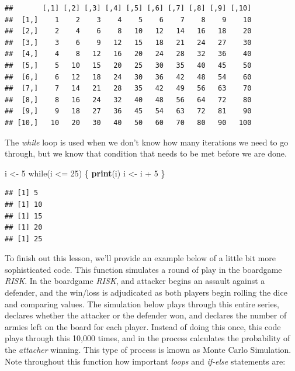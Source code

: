 \documentclass[]{book}
\newenvironment{Shaded}{\begin{snugshade}}{\end{snugshade}}
\newcommand{\KeywordTok}[1]{\textcolor[rgb]{0.13,0.29,0.53}{\textbf{{#1}}}}
\newcommand{\DecValTok}[1]{\textcolor[rgb]{0.00,0.00,0.81}{{#1}}}
\newcommand{\StringTok}[1]{\textcolor[rgb]{0.31,0.60,0.02}{{#1}}}
\newcommand{\NormalTok}[1]{{#1}}
\begin{document}
\begin{verbatim}
##       [,1] [,2] [,3] [,4] [,5] [,6] [,7] [,8] [,9] [,10]
##  [1,]    1    2    3    4    5    6    7    8    9    10
##  [2,]    2    4    6    8   10   12   14   16   18    20
##  [3,]    3    6    9   12   15   18   21   24   27    30
##  [4,]    4    8   12   16   20   24   28   32   36    40
##  [5,]    5   10   15   20   25   30   35   40   45    50
##  [6,]    6   12   18   24   30   36   42   48   54    60
##  [7,]    7   14   21   28   35   42   49   56   63    70
##  [8,]    8   16   24   32   40   48   56   64   72    80
##  [9,]    9   18   27   36   45   54   63   72   81    90
## [10,]   10   20   30   40   50   60   70   80   90   100
\end{verbatim}

The \emph{while} loop is used when we don't know how many iterations we
need to go through, but we know that condition that needs to be met
before we are done.

\begin{Shaded}
\begin{Highlighting}[]
\NormalTok{i <-}\StringTok{ }\DecValTok{5}
\NormalTok{while(i <=}\StringTok{ }\DecValTok{25}\NormalTok{) \{}
  \KeywordTok{print}\NormalTok{(i)}
  \NormalTok{i <-}\StringTok{ }\NormalTok{i +}\StringTok{ }\DecValTok{5}
\NormalTok{\}}
\end{Highlighting}
\end{Shaded}

\begin{verbatim}
## [1] 5
## [1] 10
## [1] 15
## [1] 20
## [1] 25
\end{verbatim}

To finish out this lesson, we'll provide an example below of a little
bit more sophisticated code. This function simulates a round of play in
the boardgame \emph{RISK}. In the boardgame \emph{RISK}, and attacker
begins an assault against a defender, and the win/loss is adjudicated as
both players begin rolling the dice and comparing values. The simulation
below plays through this entire series, declares whether the attacker or
the defender won, and declares the number of armies left on the board
for each player. Instead of doing this once, this code plays through
this 10,000 times, and in the process calculates the probability of the
\emph{attacher} winning. This type of process is known as Monte Carlo
Simulation. Note throughout this function how important \emph{loops} and
\emph{if-else} statements are:
\end{document}
